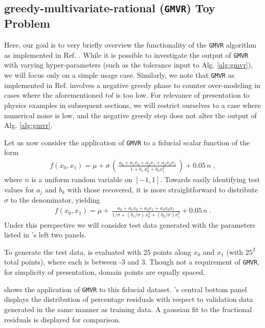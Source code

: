 \documentclass[twocolumn,aps,prd,floatfix,preprintnumbers,a4paper,nofootinbib,
superscriptaddress,10pt]{revtex4-1}
\def\gmvr#1{greedy-multivariate-rational#1
  (\texttt{GMVR}#1)\gdef\gmvr{\texttt{GMVR}}}
\begin{document}
\subsection{\gmvr{} Toy Problem}
%
Here, our goal is to very briefly overview the functionality of the \gmvr{} algorithm as implemented in Ref. \cite{lionel_london_2018_1402516}.
%
While it is possible to investigate the output of \gmvr{} with varying hyper-parameters (such as the tolerance input to Alg. \ref{alg:gmvr}), we will focus only on a simple usage case.
%
Similarly, we note that \gmvr{} as implemented in Ref. \cite{lionel_london_2018_1402516} involves a negative greedy phase to counter over-modeling in cases where the aforementioned $tol$ is too low.
%
For relevance of presentation to physics examples in subsequent sections, we will restrict ourselves to a case where numerical noise is low, and the negative greedy step does not alter the output of Alg. \ref{alg:gmvr}.
%
%
\par Let us now consider the application of \gmvr{} to a fiducial scalar function of the form
%
\begin{align}
  f(x_0,x_1) = \mu + \sigma \, \left( \, \frac{a_0 +a_1  x_0 + a_2 x_1 + a_3 x_0 x_1}{ 1 + b_1 \, x_0^2 +  b_2 x_1^2 } \, \right) + 0.05 \, n \; ,
\end{align}
%
where $n$ is a uniform random variable on $[-1,1]$.
%
Towards easily identifying test values for $a_j$ and $b_k$ with those recovered, it is more straightforward to distribute $\sigma$ to the denominator, yielding
%
\begin{align}
  \label{eq:gmvrtoy1}
  f(x_0,x_1) = \mu + \, \frac{a_0 +a_1  x_0 + a_2 x_1 + a_3 x_0 x_1}{ 1/\sigma + (b_1/\sigma) \, x_0^2 +  (b_2/\sigma) x_1^2 } + 0.05 \, n \; .
\end{align}
%
Under this perspective we will consider test data generated with the parameters listed in 's left two panels.
%
\par To generate the test data,  is evaluated with 25 points along $x_0$ and $x_1$ (with $25^2$ total points), where each is between -3 and 3. Though not a requirement of \gmvr{}, for simplicity of presentation, domain points are equally spaced.
%
\par {} shows the application of \gmvr{} to this fiducial dataset.
%
's central bottom panel displays the distribution of percentage residuals with respect to validation data generated in the same manner as training data.
%
A gaussian fit to the fractional residuals is displayed for comparison.
\end{document}
